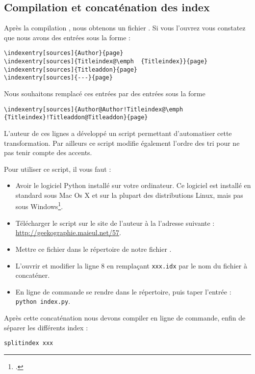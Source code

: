 \subsection{Compilation et concaténation des index}


Après la  compilation \XeLaTeX, nous obtenons un fichier . Si vous l'ouvrez vous constatez que nous avons des entrées sous la forme : 

\begin{verbatim}
\indexentry[sources]{Author}{page}
\indexentry[sources]{Titleindex@\emph  {Titleindex}}{page}
\indexentry[sources]{Titleaddon}{page}
\indexentry[sources]{---}{page}
\end{verbatim}

Nous souhaitons remplacé ces entrées par des entrées sous la forme 

\begin{verbatim}
\indexentry[sources]{Author@Author!Titleindex@\emph  {Titleindex}!Titleaddon@Titleaddon}{page}
\end{verbatim}

L'auteur de ces lignes a développé un script permettant d'automatiser cette transformation. Par ailleurs ce script modifie également l'ordre des tri pour ne pas tenir compte des accents.

Pour utiliser ce script, il vous faut :\label{python}
\begin{itemize}
\item Avoir le logiciel Python installé sur votre ordinateur. Ce logiciel est installé en standard sous Mac Os X et sur la plupart des distributions Linux, mais pas sous Windows\footcite{python_windows}.
\item Télécharger le script sur le site de l'auteur à la l'adresse suivante : \url{http://geekographie.maieul.net/57}.
\item Mettre ce fichier dans le répertoire de notre fichier . 
\item L'ouvrir et modifier la ligne 8 en remplaçant \verb|xxx.idx| par le nom du fichier à concaténer.
\item En ligne de commande se rendre dans le  répertoire, puis taper l'entrée : \verb|python index.py|.
\end{itemize}


Après cette concaténation nous devons compiler en ligne de commande, enfin de séparer les différents index :
\begin{verbatim}
splitindex xxx
\end{verbatim}


